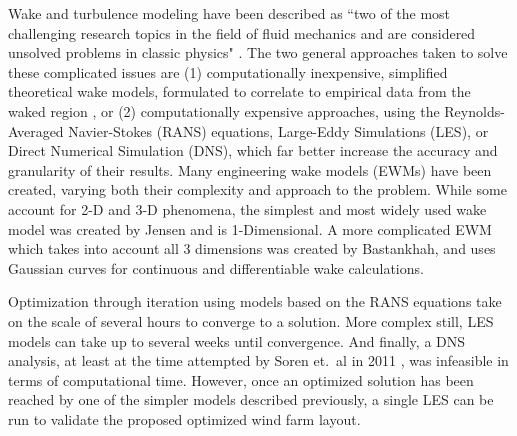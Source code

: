     Wake and turbulence modeling have been described as ``two of the most challenging research topics in the field of fluid mechanics and are considered unsolved problems in classic physics" \cite{HerbertAcero2014}.
    The two general approaches taken to solve these complicated issues are (1) computationally inexpensive, simplified theoretical wake models, formulated to correlate to empirical data from the waked region \cite{Sanderse2009, Larsen2009, Vermeer2003}, or (2) computationally expensive approaches, using the Reynolds-Averaged Navier-Stokes (RANS) equations, Large-Eddy Simulations (LES), or Direct Numerical Simulation (DNS), which far better increase the accuracy and granularity of their results\cite{Soren2011}.
    Many engineering wake models (EWMs) have been created, varying both their complexity and approach to the problem.
    While some account for 2-D and 3-D phenomena, the simplest and most widely used wake model was created by Jensen \cite{Jensen1983} and is 1-Dimensional.
    A more complicated EWM which takes into account all 3 dimensions was created by Bastankhah, and uses Gaussian curves for continuous and differentiable wake calculations. 

    Optimization through iteration using models based on the RANS equations take on the scale of several hours to converge to a solution.
    More complex still, LES models can take up to several weeks until convergence.
    And finally, a DNS analysis, at least at the time attempted by Soren et.~al in 2011 \cite{Soren2011}, was infeasible in terms of computational time.
    However, once an optimized solution has been reached by one of the simpler models described previously, a single LES can be run to validate the proposed optimized wind farm layout.

